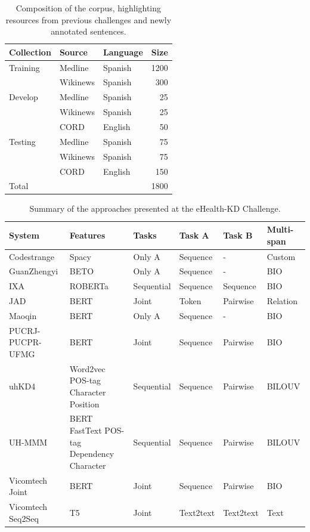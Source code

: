 \documentclass[a4paper,11pt,twocolumn,twoside]{article}
\begin{document}
\begin{table}
  \begin{tabular}{lllr}
    \toprule
    \textbf{Collection} & \textbf{Source} & \textbf{Language} & \textbf{Size} \\
    \midrule
    Training & Medline & Spanish & 1200 \\
             & Wikinews & Spanish & 300 \\
    \midrule
    Develop & Medline & Spanish & 25 \\
            & Wikinews & Spanish & 25 \\
            & CORD & English & 50 \\
    \midrule
    Testing & Medline & Spanish & 75 \\
            & Wikinews & Spanish & 75 \\
            & CORD & English & 150 \\
    \midrule
    Total   &      &         & 1800 \\
    \bottomrule
  \end{tabular}
  \caption{Composition of the corpus, highlighting resources from previous
  challenges and newly annotated sentences.\label{tab:corpus}}
\end{table}

\begin{table}[t!]
  \centering
  \begin{tabularx}{\textwidth}{lXllll}
    \toprule
    \textbf{System} & \textbf{Features} & \textbf{Tasks} & \textbf{Task A} & \textbf{Task B} & \textbf{Multi-span} \\
    \midrule
    Codestrange & Spacy & Only A & Sequence & - & Custom \\
    GuanZhengyi & BETO & Only A & Sequence & - & BIO \\
    IXA & ROBERTa & Sequential & Sequence & Sequence & BIO \\
    JAD & BERT & Joint & Token & Pairwise & Relation \\
    Maoqin & BERT & Only A & Sequence & - & BIO \\
    PUCRJ-PUCPR-UFMG & BERT & Joint & Sequence & Pairwise & BIO \\
    uhKD4 & Word2vec POS-tag Character Position & Sequential & Sequence & Pairwise & BILOUV \\
    UH-MMM & BERT FastText POS-tag Dependency Character & Sequential & Sequence & Pairwise & BILOUV \\
    Vicomtech Joint & BERT & Joint & Sequence & Pairwise & BIO \\
    Vicomtech Seq2Seq & T5 & Joint & Text2text & Text2text & Text \\
    \bottomrule
  \end{tabularx}
  \caption{Summary of the approaches presented at the eHealth-KD Challenge.\label{tab:participants}}
\end{table}
\end{document}
